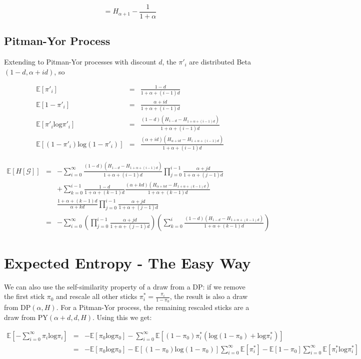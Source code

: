 \documentclass[11pt]{article}
\newcommand{\Log}{\mathrm{log}}
\newcommand{\E}{\mathbb{E}}
\newcommand{\G}{\mathcal{G}}
\begin{document}
\[
= H_{\alpha+1} - \frac{1}{1+\alpha}
\]

\subsection{Pitman-Yor Process}

Extending to Pitman-Yor processes with discount $d$, the $\pi'_i$ are distributed Beta$(1-d,\alpha + id)$, so 

\begin{eqnarray*}
\E[\pi'_i] & = & \frac{1-d}{1+\alpha+(i-1)d} \\
\E[1-\pi'_i] & = & \frac{\alpha+id}{1+\alpha+(i-1)d} \\
\E[\pi'_i\Log\pi'_i] & = & \frac{(1-d)(H_{1-d} - H_{1+\alpha+(i-1)d})}{1+\alpha + (i-1)d} \\
\E[(1-\pi'_i)\Log(1-\pi'_i)] & = & \frac{(\alpha + id)(H_{\alpha+id}-H_{1+\alpha+(i-1)d})}{1+\alpha+(i-1)d}
\end{eqnarray*}

\begin{eqnarray*}
\E[H[\G]] & = & -\sum_{i=0}^\infty \frac{(1-d)(H_{1-d} - H_{1+\alpha+(i-1)d})}{1+\alpha+(i-1)d}\prod_{j=0}^{i-1}\frac{\alpha+jd}{1+\alpha+(j-1)d}  \\
& & + \sum_{k=0}^{i-1} \frac{1-d}{1+\alpha+(k-1)d} \frac{(\alpha+kd)(H_{\alpha+kd}-H_{1+\alpha+(k-1)d})}{1+\alpha + (k-1)d} \\
& & \frac{1+\alpha+(k-1)d}{\alpha+kd}\prod_{j=0}^{i-1} \frac{\alpha+jd}{1+\alpha+(j-1)d} \\
& = & -\sum_{i=0}^\infty \left(\prod_{j=0}^{i-1}\frac{\alpha+jd}{1+\alpha+(j-1)d}\right) \left(\sum_{k=0}^{i}\frac{(1-d)(H_{1-d} - H_{1+\alpha+(k-1)d})}{1+\alpha+(k-1)d} \right)
\end{eqnarray*}

\section{Expected Entropy - The Easy Way}

We can also use the self-similarity property of a draw from a DP: if we remove the first stick $\pi_0$ and rescale all other sticks $\pi^*_i = \frac{\pi_i}{1-\pi_0}$, the result is also a draw from DP$(\alpha,H)$.  For a Pitman-Yor process, the remaining rescaled sticks are a draw from PY$(\alpha+d,d,H)$.  Using this we get:

\begin{eqnarray*}
\E\left[-\sum_{i=0}^\infty \pi_i\Log\pi_i\right] & = & -\E[\pi_0\Log\pi_0] - \sum_{i=0}^\infty \E[(1-\pi_0)\pi^*_i(\Log(1-\pi_0) + \Log\pi^*_i)] \\
& = & -\E[\pi_0\Log\pi_0] - \E[(1-\pi_0)\Log(1-\pi_0)]\sum_{i=0}^\infty\E[\pi^*_i] - \E[1-\pi_0]\sum_{i=0}^\infty\E[\pi^*_i\Log\pi^*_i]
\end{eqnarray*}
\end{document}
